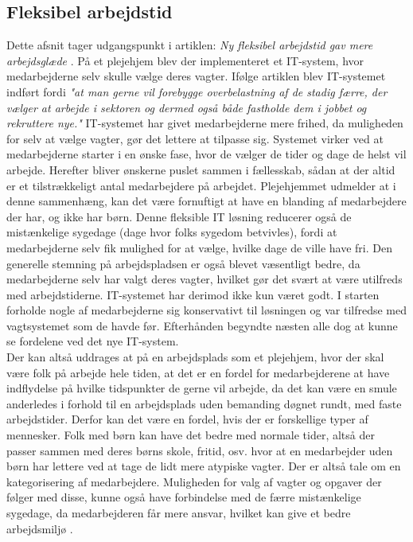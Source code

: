 \subsection{Fleksibel arbejdstid}
Dette afsnit tager udgangspunkt i artiklen: \textit{Ny fleksibel arbejdstid gav mere arbejdsglæde} \citep{Thomse2014}. På et plejehjem blev der implementeret et IT-system, hvor medarbejderne selv skulle vælge deres vagter. Ifølge artiklen blev IT-systemet indført fordi \textit{"at man gerne vil forebygge overbelastning af de stadig færre, der vælger at arbejde i sektoren og dermed også både fastholde dem i jobbet og rekruttere nye."} IT-systemet har givet medarbejderne mere frihed, da muligheden for selv at vælge vagter, gør det lettere at tilpasse sig. Systemet virker ved at medarbejderne starter i en ønske fase, hvor de vælger de tider og dage de helst vil arbejde. Herefter bliver ønskerne puslet sammen i fællesskab, sådan at der altid er et tilstrækkeligt antal medarbejdere på arbejdet. Plejehjemmet udmelder at i denne sammenhæng, kan det være fornuftigt at have en blanding af medarbejdere der har, og ikke har børn. Denne fleksible IT løsning reducerer også de mistænkelige sygedage (dage hvor folks sygedom betvivles), fordi at medarbejderne selv fik mulighed for at vælge, hvilke dage de ville have fri. Den generelle stemning på arbejdspladsen er også blevet væsentligt bedre, da medarbejderne selv har valgt deres vagter, hvilket gør det svært at være utilfreds med arbejdstiderne. IT-systemet har derimod ikke kun været godt. I starten forholde nogle af medarbejderne sig konservativt til løsningen og var tilfredse med vagtsystemet som de havde før. Efterhånden begyndte næsten alle dog at kunne se fordelene ved det nye IT-system. 
\\Der kan altså uddrages at på en arbejdsplads som et plejehjem, hvor der skal være folk på arbejde hele tiden, at det er en fordel for medarbejderene at have indflydelse på hvilke tidspunkter de gerne vil arbejde, da det kan være en smule anderledes i forhold til en arbejdsplads uden bemanding døgnet rundt, med faste arbejdstider. Derfor kan det være en fordel, hvis der er forskellige typer af mennesker. Folk med børn kan have det bedre med normale tider, altså der passer sammen med deres børns skole, fritid, osv. hvor at en medarbejder uden børn har lettere ved at tage de lidt mere atypiske vagter. Der er altså tale om en kategorisering af medarbejdere. Muligheden for valg af vagter og opgaver der følger med disse, kunne også have forbindelse med de færre mistænkelige sygedage, da medarbejderen får mere ansvar, hvilket kan give et bedre arbejdsmiljø \citep{Sygdag}.

